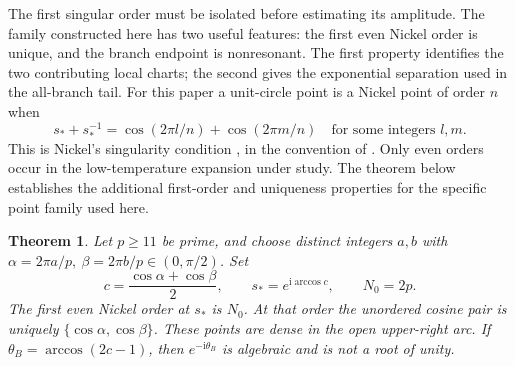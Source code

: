 \documentclass[11pt]{article}
\numberwithin{equation}{section}
\newtheorem{theorem}{Theorem}[section]
\theoremstyle{definition}
\newcommand{\ii}{\mathrm i}
\newcommand{\sstar}{s_*}
\begin{document}
The first singular order must be isolated before estimating its
amplitude. The family constructed here has two useful features: the
first even Nickel order is unique, and the branch endpoint is
nonresonant. The first property identifies the two contributing local
charts; the second gives the exponential separation used in the
all-branch tail.
For this paper a unit-circle point is a Nickel point of order \(n\)
when
\[
 s_*+s_*^{-1}
   =\cos(2\pi l/n)+\cos(2\pi m/n)
 \quad\text{for some integers }l,m.
\]
This is Nickel's singularity condition
\cite{Nickel1999,Nickel2000}, in the convention of \cite{TW2014}.
Only even orders occur in the low-temperature expansion under study.
The theorem below establishes the additional first-order and uniqueness
properties for the specific point family used here.
\begin{theorem}\label{thm:prime}
Let \(p\ge11\) be prime, and choose distinct integers \(a,b\) with
\(\alpha=2\pi a/p,\ \beta=2\pi b/p\in(0,\pi/2)\).
Set
\[
 c=\frac{\cos\alpha+\cos\beta}{2},\qquad
 \sstar=e^{\ii\arccos c},\qquad N_0=2p.
\]
The first even Nickel order at \(\sstar\) is \(N_0\).
At that order the unordered cosine pair is uniquely
\(\{\cos\alpha,\cos\beta\}\).
These points are dense in the open upper-right arc.
If \(\theta_B=\arccos(2c-1)\), then \(e^{-\ii\theta_B}\) is algebraic
and is not a root of unity.
\end{theorem}
\end{document}
